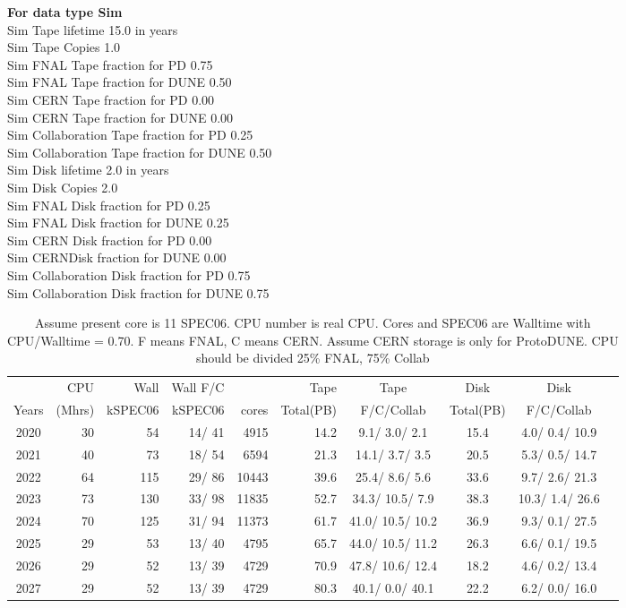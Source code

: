 \documentclass[12pt]{article}
\begin{document}
{\bf For data type Sim}\\
   Sim Tape lifetime  15.0 in years\\
   Sim Tape Copies   1.0\\
   Sim FNAL Tape fraction for PD  0.75\\
   Sim FNAL Tape fraction for DUNE  0.50\\
   Sim CERN Tape fraction for PD  0.00\\
   Sim CERN Tape fraction for DUNE  0.00\\
   Sim Collaboration Tape fraction for PD  0.25\\
   Sim Collaboration Tape fraction for DUNE  0.50\\
   Sim Disk lifetime   2.0 in years\\
   Sim Disk Copies   2.0\\
   Sim FNAL Disk fraction for PD  0.25\\
   Sim FNAL Disk fraction for DUNE  0.25\\
   Sim CERN Disk fraction for PD  0.00\\
   Sim CERNDisk fraction for DUNE  0.00\\
   Sim Collaboration Disk fraction for PD  0.75\\
   Sim Collaboration Disk fraction for DUNE  0.75\\
\begin{table}
\footnotesize
 \centering \begin{tabular}[h]{crrrrrcccc}
 & CPU &Wall&Wall F/C&\qquad  & Tape\qquad& Tape\qquad  & Disk\qquad  & Disk\qquad \\
Years&(Mhrs)&kSPEC06&kSPEC06&cores& Total(PB)&F/C/Collab & Total(PB) &F/C/Collab\\
\hline
2020&	  30&	  54&	  14/  41&	  4915&	     14.2&	   9.1/  3.0/  2.1&	     15.4&	   4.0/  0.4/ 10.9\\
2021&	  40&	  73&	  18/  54&	  6594&	     21.3&	  14.1/  3.7/  3.5&	     20.5&	   5.3/  0.5/ 14.7\\
2022&	  64&	 115&	  29/  86&	 10443&	     39.6&	  25.4/  8.6/  5.6&	     33.6&	   9.7/  2.6/ 21.3\\
2023&	  73&	 130&	  33/  98&	 11835&	     52.7&	  34.3/ 10.5/  7.9&	     38.3&	  10.3/  1.4/ 26.6\\
2024&	  70&	 125&	  31/  94&	 11373&	     61.7&	  41.0/ 10.5/ 10.2&	     36.9&	   9.3/  0.1/ 27.5\\
2025&	  29&	  53&	  13/  40&	  4795&	     65.7&	  44.0/ 10.5/ 11.2&	     26.3&	   6.6/  0.1/ 19.5\\
2026&	  29&	  52&	  13/  39&	  4729&	     70.9&	  47.8/ 10.6/ 12.4&	     18.2&	   4.6/  0.2/ 13.4\\
2027&	  29&	  52&	  13/  39&	  4729&	     80.3&	  40.1/  0.0/ 40.1&	     22.2&	   6.2/  0.0/ 16.0\\
\end{tabular}
\caption{Assume present core is   11 SPEC06. CPU number is real CPU. Cores and SPEC06 are Walltime with CPU/Walltime =  0.70.  F means FNAL, C means CERN. Assume CERN storage is only  for ProtoDUNE. CPU should be divided 25\% FNAL, 75\% Collab}\normalsize
 \end{table}
\end{document}

